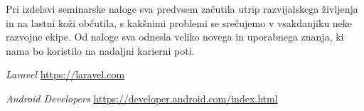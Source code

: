 \documentclass[a4paper,12pt]{report}
\begin{document}
Pri izdelavi seminarske naloge sva predvsem začutila utrip razvijalskega življenja in na lastni koži občutila, s kakšnimi problemi se srečujemo v vsakdanjiku neke razvojne ekipe. Od naloge sva odnesla veliko novega in uporabnega znanja, ki nama bo koristilo na nadaljni karierni poti.

\begin{thebibliography}{99}
\addtocounter{chapter}{1}

 \emph{Laravel} \url{https://laravel.com} 

 \emph{Android Developers} \url{https://developer.android.com/index.html}


\end{thebibliography}

\end{document}

